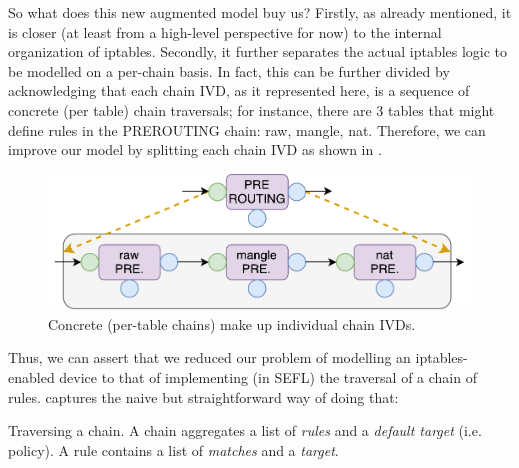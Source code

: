 So what does this new augmented model buy us?  Firstly, as already mentioned,
it is closer (at least from a high-level perspective for now) to the internal
organization of iptables.  Secondly, it further separates the actual iptables
logic to be modelled on a per-chain basis.  In fact, this can be further
divided by acknowledging that each chain IVD, as it represented here, is a
sequence of concrete (per table) chain traversals; for instance, there are 3
tables that might define rules in the PREROUTING chain: raw, mangle, nat.
Therefore, we can improve our model by splitting each chain IVD as shown in
.

\begin{figure}[h]
  \centering
  \captionsetup{justification=centering}
  \includegraphics[scale=0.5]{src/img/iptables-2-composition}
  \caption[Concrete (per-table chains) make up individual chain IVDs.]{Concrete
  (per-table chains) make up individual chain IVDs.}
  \label{fig:iptables-2-composition}
\end{figure}

Thus, we can assert that we reduced our problem of modelling an
iptables-enabled device to that of implementing (in SEFL) the traversal of a
chain of rules.  captures the
naive but straightforward way of doing that:

\begin{algorithm}[H]

  \caption[Traversing a chain.]{Traversing a chain. A chain aggregates a list
  of \emph{rules} and a \emph{default target} (i.e. policy). A rule contains a
  list of \emph{matches} and a \emph{target}.}
  \label{algo:chain-traversal}
\end{algorithm}

